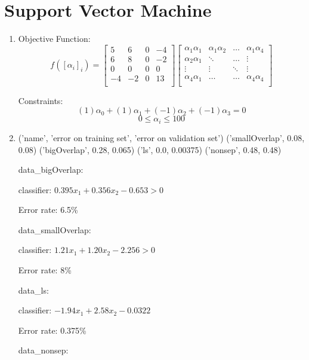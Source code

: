 \documentclass{paper}
\begin{document}
\section{Support Vector Machine}

\begin{enumerate}
    \item

    Objective Function:
    \begin{equation*}
f([\alpha_i]_i) = \begin{bmatrix}
5 & 6 & 0 & -4 \\
6 & 8 & 0 & -2 \\
0 & 0 & 0 & 0 \\
-4 & -2 & 0 & 13 \\
    \end{bmatrix} \begin{bmatrix}
\alpha_1\alpha_1 & \alpha_1\alpha_2 & \hdots & \alpha_1\alpha_4 \\
\alpha_2\alpha_1 & \ddots & \hdots & \vdots \\
\vdots & \vdots & \ddots & \vdots \\
\alpha_4\alpha_1 & \hdots & \hdots & \alpha_4\alpha_4 \\
    \end{bmatrix}
 \end{equation*}

Constraints:
\[
(1)\alpha_0 +
(1)\alpha_1 +
(-1)\alpha_2 +
(-1)\alpha_3 = 0 \]
\[  0 \le \alpha_i \le 100 \]

    \item 
('name', 'error on training set', 'error on validation set')
('smallOverlap', 0.08, 0.08)
('bigOverlap', 0.28, 0.065)
('ls', 0.0, 0.00375)
('nonsep', 0.48, 0.48)

data\_bigOverlap:

    classifier: $0.395 x_1 + 0.356 x_2 - 0.653 > 0$

Error rate: 6.5\%



data\_smallOverlap:

classifier:  $1.21 x_1 + 1.20 x_2 - 2.256 > 0$

Error rate: 8\%



data\_ls:

classifier: $-1.94 x_1 + 2.58 x_2 - 0.0322$

Error rate: 0.375\%



data\_nonsep:


\end{enumerate}
\end{document}
